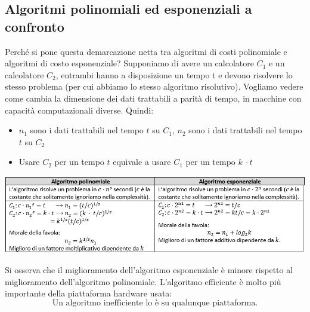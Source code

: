 \subsection{Algoritmi polinomiali ed esponenziali a confronto}
Perché si pone questa demarcazione netta tra algoritmi di costi polinomiale e algoritmi di costo esponenziale? 
Supponiamo di avere un calcolatore $C_1$ e un calcolatore $C_2$, entrambi hanno a disposizione un tempo t e devono risolvere lo stesso problema (per cui abbiamo lo stesso algoritmo risolutivo). Vogliamo vedere come cambia la dimensione dei dati trattabili a parità di tempo, in macchine con capacità computazionali diverse. Quindi:
\begin{itemize}
	\item $n_1$ sono i dati trattabili nel tempo $t$ su $C_1$, $n_2$ sono i dati trattabili nel tempo $t$ su $C_2$
	\item Usare $C_2$ per un tempo $t$ equivale a usare $C_1$ per un tempo $k\ \cdot t$
\end{itemize}
\begin{center}\includegraphics[scale=.9]{images/1.PNG}\end{center}
Si osserva che il miglioramento dell’algoritmo esponenziale è minore rispetto al miglioramento dell’algoritmo polinomiale. 
L’algoritmo efficiente è molto più importante della piattaforma hardware usata: 
\[\boxed{\text{Un algoritmo inefficiente lo è su qualunque piattaforma.}}\]

